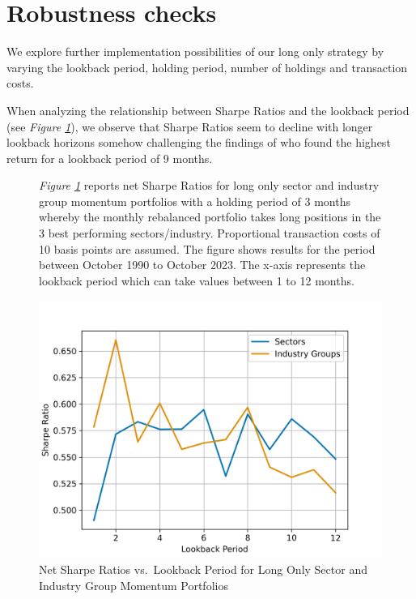 \documentclass[a4paper,12pt,twoside]{article}
\begin{document}
\newpage
\section{Robustness checks}
We explore further implementation possibilities of our long only strategy by varying the lookback period, holding period, number of holdings and transaction costs. 

When analyzing the relationship between Sharpe Ratios and the lookback period (see \textit{Figure \ref{fig_06}}), we observe that Sharpe Ratios seem to decline with longer lookback horizons somehow challenging the findings of \cite{jegadeesh1993returns} who found the highest return for a lookback period of 9 months. 

\begin{figure}[H]
        \captionsetup{justification=centering}
   \caption{Net Sharpe Ratios vs.~Lookback Period for Long Only Sector and Industry Group Momentum Portfolios}
    \label{fig_06}
        \textit{Figure \ref{fig_06}} reports net Sharpe Ratios for long only sector and industry group momentum portfolios with a holding period of 3 months whereby the monthly rebalanced portfolio takes long positions in the 3 best performing sectors/industry. Proportional transaction costs of 10 basis points are assumed. The figure shows results for the period between October 1990 to October 2023. The x-axis represents the lookback period which can take values between 1 to 12 months.
    \centerline{\includegraphics[width=1\textwidth]{Plots/robustness_check_lookback.png}}
\end{figure}
\end{document}
